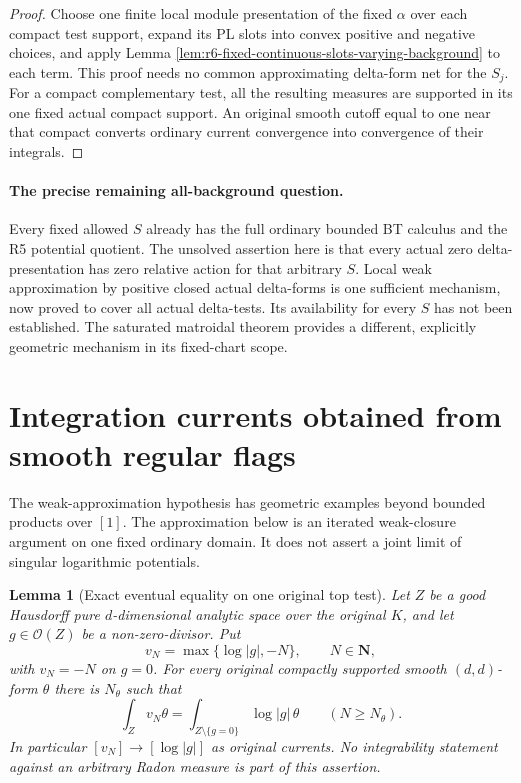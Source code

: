 \documentclass[11pt,a4paper]{article}
\numberwithin{equation}{section}
\newtheorem{lemma}[theorem]{Lemma}
\theoremstyle{definition}
\theoremstyle{remark}
\begin{document}
\begin{proof}
Choose one finite local module presentation of the fixed
$\alpha$ over each compact test support, expand its PL
slots into convex positive and negative choices, and
apply Lemma
\ref{lem:r6-fixed-continuous-slots-varying-background}
to each term. This proof needs no common approximating
delta-form net for the $S_j$. For a compact complementary
test, all the resulting measures are supported in its
one fixed actual compact support. An original smooth
cutoff equal to one near that compact converts ordinary
current convergence into convergence of their integrals.
\end{proof}

\paragraph{The precise remaining all-background question.}
Every fixed allowed $S$ already has the full ordinary
bounded BT calculus and the R5 potential quotient.
The unsolved assertion here is that every actual zero
delta-presentation has zero relative action for that
arbitrary $S$. Local weak approximation by positive
closed actual delta-forms is one sufficient mechanism,
now proved to cover all actual delta-tests. Its
availability for every $S$ has not been established.
The saturated matroidal theorem provides a different,
explicitly geometric mechanism in its fixed-chart scope.



\section{Integration currents obtained from smooth regular flags}
\label{sec:r6-delta-smooth-flag}

The weak-approximation hypothesis has geometric examples beyond
bounded products over $[1]$.  The approximation below is an iterated
weak-closure argument on one fixed ordinary domain.  It does not
assert a joint limit of singular logarithmic potentials.

\begin{lemma}[Exact eventual equality on one original top test]
\label{lem:r6-log-truncation-original-test}
Let $Z$ be a good Hausdorff pure $d$-dimensional analytic space over
the original $K$, and let $g\in\mathcal O(Z)$ be a non-zero-divisor.
Put
\[
             v_N=\max\{\log|g|,-N\},\qquad N\in\mathbf N,
\]
with $v_N=-N$ on $g=0$.  For every original compactly supported
smooth $(d,d)$-form $\theta$ there is $N_\theta$ such that
\[
       \int_Z v_N\theta
          =\int_{Z\setminus\{g=0\}}\log|g|\,\theta
                  \qquad(N\geq N_\theta).
\]
In particular $[v_N]\to[\log|g|]$ as original currents.  No
integrability statement against an arbitrary Radon measure is
part of this assertion.
\end{lemma}
\end{document}
